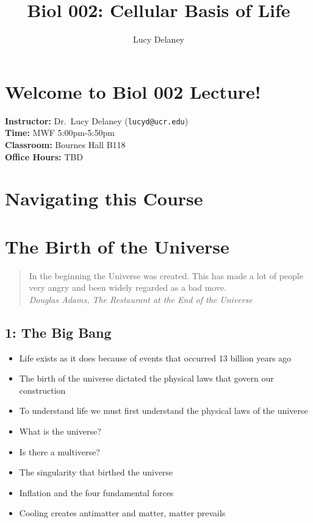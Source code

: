 \documentclass[
]{report}
\title{Biol 002: Cellular Basis of Life}
\author{Lucy Delaney}
\date{}
\providecommand{\tightlist}{%
  \setlength{\itemsep}{0pt}\setlength{\parskip}{0pt}}
\providecommand{\tightlist}{%
  \setlength{\itemsep}{0pt}\setlength{\parskip}{0pt}}
\begin{document}
\maketitle

{
\setcounter{tocdepth}{1}
\tableofcontents
}
\hypertarget{welcome-to-biol-002-lecture}{%
\chapter*{Welcome to Biol 002 Lecture!}\label{welcome-to-biol-002-lecture}}

\textbf{Instructor:} Dr.~Lucy Delaney (\texttt{lucyd@ucr.edu})\\
\textbf{Time:} MWF 5:00pm-5:50pm\\
\textbf{Classroom:} Bournes Hall B118\\
\textbf{Office Hours:} TBD

\hypertarget{navigating-this-course}{%
\chapter*{Navigating this Course}\label{navigating-this-course}}

\hypertarget{the-birth-of-the-universe}{%
\chapter{The Birth of the Universe}\label{the-birth-of-the-universe}}

\begin{quote}
In the beginning the Universe was created. This has made a lot of people very angry and been widely regarded as a bad move.\\
\emph{Douglas Adams, The Restaurant at the End of the Universe}
\end{quote}

\hypertarget{the-big-bang}{%
\section*{1: The Big Bang}\label{the-big-bang}}

\begin{itemize}
\tightlist
\item
  Life exists as it does because of events that occurred 13 billion years ago
\item
  The birth of the universe dictated the physical laws that govern our construction
\item
  To understand life we must first understand the physical laws of the universe
\item
  What is the universe?
\item
  Is there a multiverse?
\item
  The singularity that birthed the universe
\item
  Inflation and the four fundamental forces
\item
  Cooling creates antimatter and matter, matter prevails
\end{itemize}
\end{document}
